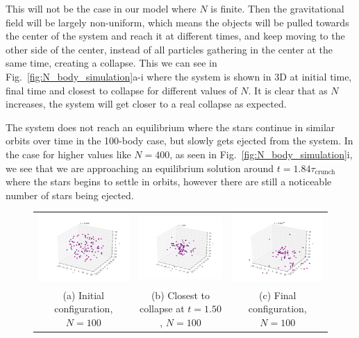 \documentclass{article}
\begin{document}
\begin{multicols}{2}
This will not be the case in our model where $N$ is finite. Then the gravitational field will be largely non-uniform, which means the objects will be pulled towards the center of the system and reach it at different times, and keep moving to the other side of the center, instead of all particles gathering in the center at the same time, creating a collapse. This we can see in Fig.~\ref{fig:N_body_simulation}a-i where the system is shown in 3D at initial time, final time and closest to collapse for different values of $N$. It is clear that as $N$ increases, the system will get closer to a real collapse as expected.

The system does not reach an equilibrium where the stars continue in similar orbits over time in the 100-body case, but slowly gets ejected from the system. In the case for higher values like $N = 400$, as seen in Fig.~\ref{fig:N_body_simulation}i, we see that we are approaching an equilibrium solution around $t = 1.84\tau_{\mathrm{crunch}}$ where the stars begins to settle in orbits, however there are still a noticeable number of stars being ejected. 

\begin{figure}
\begin{center}
\begin{tabular}{ccc}
  	\includegraphics[width=60mm]{Images/Image_100_0000.png}
	& \includegraphics[width=60mm]{Images/Image_100_1500.png}
	& \includegraphics[width=60mm]{Images/Image_100_4995.png} \\
	(a) Initial configuration, $N = 100$				& (b) Closest to collapse at $t = 1.50$, $N = 100$	 	& (c) Final configuration, $N = 100$	 \\[6pt]
	

\end{tabular}
\end{center}
\end{figure}
\end{multicols}
\end{document}
